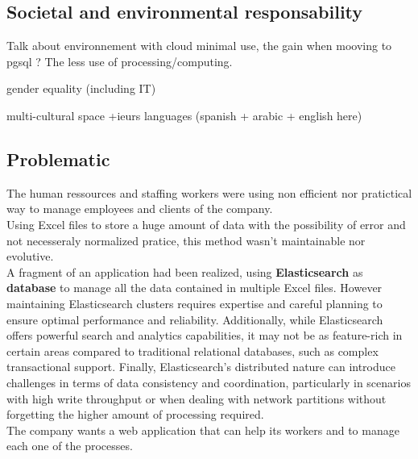 \subsection{Societal and environmental responsability}


Talk about environnement with cloud minimal use, the gain when mooving to pgsql ? The less use of processing/computing.

gender equality (including IT)


multi-cultural space +ieurs languages (spanish + arabic + english here)

\subsection{Problematic}


The human ressources and staffing workers were using non efficient nor pratictical way to manage employees and clients of the company.\\
Using Excel files to store a huge amount of data with the possibility of error and not necesseraly normalized pratice, this method wasn't maintainable nor evolutive.\\

A fragment of an application had been realized, using \textbf{Elasticsearch} as \textbf{database} to manage all the data contained in multiple Excel files. However maintaining Elasticsearch clusters requires expertise and careful planning to ensure optimal performance and reliability. Additionally, while Elasticsearch offers powerful search and analytics capabilities, it may not be as feature-rich in certain areas compared to traditional relational databases, such as complex transactional support. Finally, Elasticsearch's distributed nature can introduce challenges in terms of data consistency and coordination, particularly in scenarios with high write throughput or when dealing with network partitions without forgetting the higher amount of processing required.\\

The company wants a web application that can help its workers and to manage each one of the processes.
